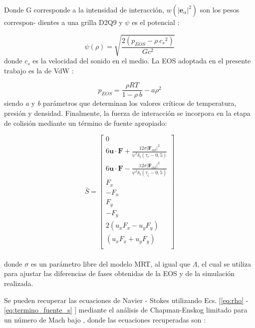 Donde G corresponde a la intensidad de interacción, $w({|{\mathbf{e}}_{\alpha}|}^{2})$ son los pesos correspon- dientes a una grilla D2Q9 y $\psi$ es el potencial :

\begin{equation} 
    \psi(\rho) = \sqrt{\frac{2 (p_{EOS} - \rho \> {c_{s}}^{2})}{G {c}^{2}}}
    \label{eq:psi}
\end{equation}
donde $c_{s}$ es la velocidad del sonido en el medio. La EOS adoptada en el presente trabajo es la de VdW :

\begin{equation}
    p_{EOS} = \frac{\rho R T}{1- \rho \> b} - a {\rho}^{2}
    \label{eq:rho_eos}
\end{equation}
siendo \textit{a} y \textit{b} parámetros que determinan los valores críticos de temperatura, presión y densidad. Finalmente, la fuerza de interacción se incorpora en la etapa de colisión mediante un término de fuente apropiado:

\begin{equation}
    \bar{S} = 
    \left[ \begin{array}{c} 
        0\\
        6 \mathbf{u}\cdot \mathbf{F} + \frac{12 \sigma {|{\mathbf{F}_{int}|}}^{2} }{{\psi}^{2} \delta_{t} (\tau_{e} - 0,5)}\\
        6 \mathbf{u}\cdot \mathbf{F} - \frac{12 \sigma {|{\mathbf{F}_{int}|}}^{2} }{{\psi}^{2} \delta_{t} (\tau_{\zeta } - 0,5)}\\
        F_{x}\\
        -F_{x}\\
        F_{y}\\
        -F_{y}\\
        2(u_{x} F_{x} - u_{y} F_{y} )\\
        (u_{x} F_{x} + u_{y} F_{y} )\\              
    \end{array}
    \right]    
    \label{eq:termino_fuente_s}
\end{equation}
\\
donde $\sigma$ es un parámetro libre del modelo MRT, al igual que $\Lambda$, el cual se utiliza para ajustar las diferencias de fases obtenidas de la EOS y de la simulación realizada.

Se pueden recuperar las ecuaciones de Navier - Stokes utilizando Ecs. [\ref{eq:rho} - \ref{eq:termino_fuente_s} ] mediante el análisis de Chapman-Enskog limitado para un número de Mach bajo \cite{li2013lattice}, donde las ecuaciones recuperadas son \cite{fogliatto2019simulation} \cite{li2013lattice}:

